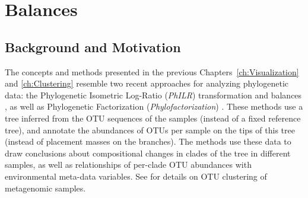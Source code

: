 
\chapter{Balances}
\label{ch:Balances}




\section{Background and Motivation}
\label{ch:Balances:sec:Motivation}



The concepts and methods presented in the previous Chapters~\ref{ch:Visualization} and \ref{ch:Clustering}
resemble two recent approaches for analyzing phylogenetic data:
the Phylogenetic Isometric Log-Ratio (\emph{PhILR}) transformation and balances \cite{Silverman2017},
as well as Phylogenetic Factorization (\emph{Phylofactorization}) \cite{Washburne2017a}.
These methods use a tree inferred from the OTU sequences of the samples (instead of a fixed reference tree),
and annotate the abundances of OTUs per sample on the tips of this tree (instead of placement masses on the branches).
The methods use these data to draw conclusions about compositional changes in clades of the tree in different samples,
as well as relationships of per-clade OTU abundances with environmental meta-data variables.
See  for details on OTU clustering of metagenomic samples.

